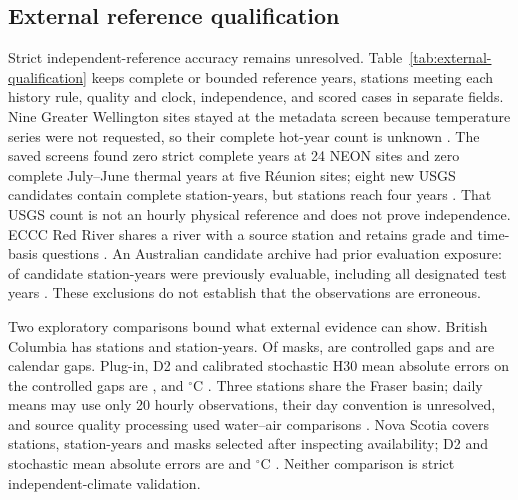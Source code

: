 \documentclass[draft,linenumbers]{agujournal2025}
\begin{document}
\subsection{External reference qualification}
Strict independent-reference accuracy remains unresolved. Table~\ref{tab:external-qualification} keeps complete or bounded reference years, stations meeting each history rule, quality and clock, independence, and scored cases in separate fields. Nine Greater Wellington sites stayed at the metadata screen because temperature series were not requested, so their complete hot-year count is unknown \cite{greaterwellington2016quality}. The saved screens found zero strict complete years at 24 NEON sites and zero complete July--June thermal years at five R\'eunion sites; eight new USGS candidates contain \USGSCompleteYears{} complete station-years, but \USGSFourYearStations{} stations reach four years \cite{marzolf2025neon,hubeautemp2026,usgsstatistics2026}. That USGS count is not an hourly physical reference and does not prove independence. ECCC Red River shares a river with a source station and retains grade and time-basis questions \cite{ecccautomated2024,usgsred2025}. An Australian candidate archive had prior evaluation exposure: \AUFirstEvaluable{} of \AURefYears{} candidate station-years were previously evaluable, including all \AUFormerTestEvaluable{} designated test years \cite{bom2026}. These exclusions do not establish that the observations are erroneous.



Two exploratory comparisons bound what external evidence can show. British Columbia has \BCStations{} stations and \BCYears{} station-years. Of \BCMaskTotal{} masks, \BCCases{} are controlled gaps and \BCCalendarMasks{} are calendar gaps. Plug-in, D2 and calibrated stochastic H30 mean absolute errors on the controlled gaps are \BCPluginMAE{}, \BCDTwoMAE{} and \BCStochasticMAE{} $^{\circ}$C \cite{moore2024bc,callahan2025air2stream}. Three stations share the Fraser basin; daily means may use only 20 hourly observations, their day convention is unresolved, and source quality processing used water--air comparisons \cite{wsc_temperature_faq}. Nova Scotia covers \NSExpStations{} stations, \NSExpYears{} station-years and \NSExpCases{} masks selected after inspecting availability; D2 and stochastic mean absolute errors are \NSExpDTwoMAE{} and \NSExpClassicMAE{} $^{\circ}$C \cite{novascotiawater2026}. Neither comparison is strict independent-climate validation.
\end{document}
